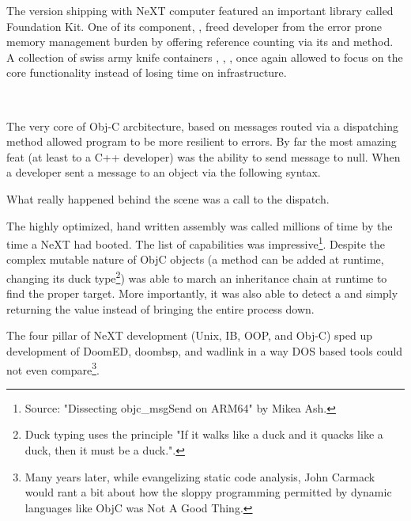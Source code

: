 \par
The version shipping with NeXT computer featured an important library called Foundation Kit. One of its component, , freed developer from the error prone memory management burden by offering reference counting via its  and  method. A collection of swiss army knife containers , , ,  once again allowed to focus on the core functionality instead of losing time on infrastructure.\\
\par
{}\\
\par
The very core of Obj-C arcbitecture, based on messages routed via a dispatching method  allowed program to be more resilient to errors. By far the most amazing feat (at least to a C++ developer) was the ability to send message to null. When a developer sent a message to an object via the following syntax.\\ \par
{}
What really happened behind the scene was a call to the dispatch.\\
\par
{}
The highly optimized, hand written assembly was called millions of time by the time a NeXT had booted. The list of capabilities was impressive\footnote{Source: "Dissecting objc\_msgSend on ARM64" by Mikea Ash.}. Despite the complex mutable nature of ObjC objects (a method can be added at runtime, changing its duck type\footnote{Duck typing uses the principle "If it walks like a duck and it quacks like a duck, then it must be a duck.".})  was able to march an inheritance chain at runtime to find the proper target. More importantly, it was also able to detect a  and simply returning the value  instead of bringing the entire process down.\\
\par

The four pillar of NeXT development (Unix, IB, OOP, and Obj-C) sped up development of DoomED, doombsp, and wadlink in a way DOS based tools could not even compare\footnote{Many years later, while evangelizing static code analysis, John Carmack would rant a bit about how the sloppy programming permitted by dynamic languages like ObjC was Not A Good Thing.}.

